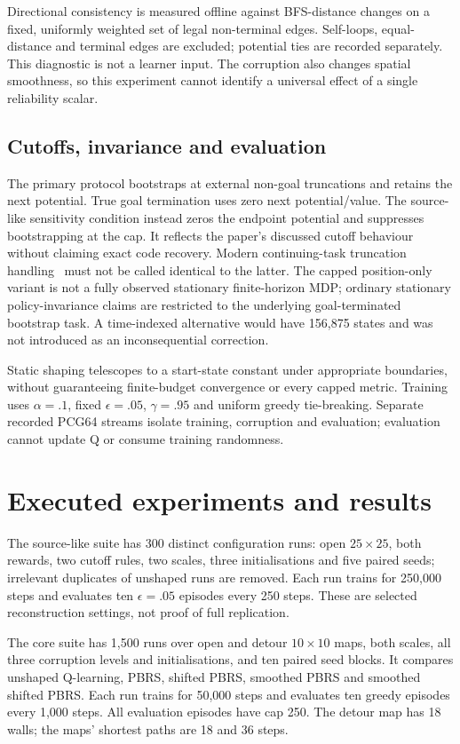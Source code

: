\documentclass{COMPXXXX}
\begin{document}
Directional consistency is measured offline against BFS-distance changes on a fixed, uniformly weighted set of legal non-terminal edges. Self-loops, equal-distance and terminal edges are excluded; potential ties are recorded separately. This diagnostic is not a learner input. The corruption also changes spatial smoothness, so this experiment cannot identify a universal effect of a single reliability scalar.

\subsection{Cutoffs, invariance and evaluation}
The primary protocol bootstraps at external non-goal truncations and retains the next potential. True goal termination uses zero next potential/value. The source-like sensitivity condition instead zeros the endpoint potential and suppresses bootstrapping at the cap. It reflects the paper's discussed cutoff behaviour without claiming exact code recovery. Modern continuing-task truncation handling~\cite{gymnasium} must not be called identical to the latter. The capped position-only variant is not a fully observed stationary finite-horizon MDP; ordinary stationary policy-invariance claims are restricted to the underlying goal-terminated bootstrap task. A time-indexed alternative would have 156,875 states and was not introduced as an inconsequential correction.

Static shaping telescopes to a start-state constant under appropriate boundaries, without guaranteeing finite-budget convergence or every capped metric. Training uses $\alpha=.1$, fixed $\epsilon=.05$, $\gamma=.95$ and uniform greedy tie-breaking. Separate recorded PCG64 streams isolate training, corruption and evaluation; evaluation cannot update Q or consume training randomness.

\section{Executed experiments and results}
The source-like suite has 300 distinct configuration runs: open $25\times25$, both rewards, two cutoff rules, two scales, three initialisations and five paired seeds; irrelevant duplicates of unshaped runs are removed. Each run trains for 250,000 steps and evaluates ten $\epsilon=.05$ episodes every 250 steps. These are selected reconstruction settings, not proof of full replication.

The core suite has 1,500 runs over open and detour $10\times10$ maps, both scales, all three corruption levels and initialisations, and ten paired seed blocks. It compares unshaped Q-learning, PBRS, shifted PBRS, smoothed PBRS and smoothed shifted PBRS. Each run trains for 50,000 steps and evaluates ten greedy episodes every 1,000 steps. All evaluation episodes have cap 250. The detour map has 18 walls; the maps' shortest paths are 18 and 36 steps.
\end{document}
